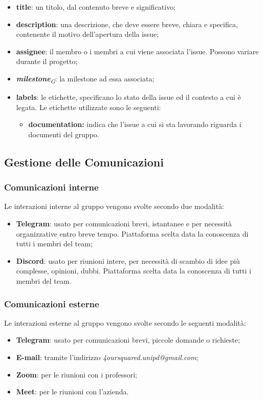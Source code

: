 \documentclass[a4paper, 12pt]{article}
\begin{document}
\begin{itemize}
    \item \textbf{title}: un titolo, dal contenuto breve e significativo;
    \item \textbf{description}: una descrizione, che deve essere breve, chiara e specifica, contenente il
    motivo dell'apertura della issue;
    \item \textbf{assignee}: il membro o i membri a cui viene associata l'issue.
    Possono variare durante il progetto;
    \item \textbf{\textit{milestone}}\textit{\textsubscript{G}}: la milestone ad
    essa associata;
    \item \textbf{labels}: le etichette, specificano lo stato della issue ed il
    contesto a cui è legata. Le etichette utilizzate sono le seguenti:
    \begin{itemize}
        \item \textbf{documentation:} indica che l'issue a cui si sta lavorando
        riguarda i documenti del gruppo.
        
    \end{itemize}
\end{itemize}


\subsection{Gestione delle Comunicazioni}

\subsubsection{Comunicazioni interne}
Le interazioni interne al gruppo vengono svolte secondo due modalità:
\begin{itemize}
    \item \textbf{Telegram}: usato per comunicazioni brevi, istantanee e per necessità organizzative entro breve tempo. Piattaforma scelta data la conoscenza di tutti i membri del team;
    \item \textbf{Discord}: usato per riunioni intere, per necessità di scambio di idee più complesse, opinioni, dubbi. Piattaforma scelta data la conoscenza di tutti i membri del team.
\end{itemize}

\subsubsection{Comunicazioni esterne}
Le interazioni esterne al gruppo vengono svolte secondo le seguenti modalità:
\begin{itemize}
    \item \textbf{Telegram}: usato per comunicazioni brevi, piccole domande o richieste;
    \item \textbf{E-mail}: tramite l'indirizzo \textit{4oursquared.unipd@gmail.com};
    \item \textbf{Zoom}: per le riunioni con i professori;
    \item \textbf{Meet}: per le riunioni con l'azienda.
\end{itemize}
\end{document}
